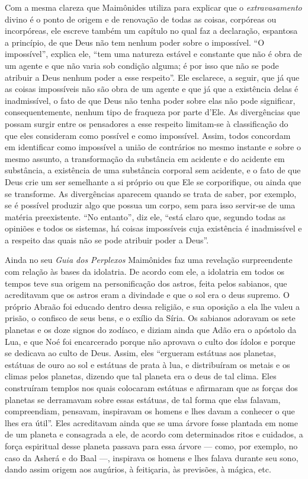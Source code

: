 Com a mesma clareza que Maimônides utiliza para explicar que o
\emph{extravasamento} divino é o ponto de origem e de renovação de todas
as coisas, corpóreas ou incorpóreas, ele escreve também um capítulo no
qual faz a declaração, espantosa a princípio, de que Deus não tem nenhum poder sobre
o impossível. ``O impossível'', explica ele, ``tem uma natureza estável
e constante que não é obra de um agente e que não varia sob condição
alguma; é por isso que não se pode atribuir a Deus nenhum poder a esse
respeito''. Ele esclarece, a seguir, que já que as coisas impossíveis
não são obra de um agente e que já que a existência delas é
inadmissível, o fato de que Deus não tenha poder sobre elas não pode
significar, consequentemente, nenhum tipo de fraqueza por parte d'Ele.
As divergências que possam surgir entre os pensadores a esse respeito
limitam-se à classificação do que eles consideram como possível e como
impossível. Assim, todos concordam em identificar como impossível a
união de contrários no mesmo instante e sobre o mesmo assunto, a
transformação da substância em acidente e do acidente em substância, a
existência de uma substância corporal sem acidente, e o fato de que Deus
crie um ser semelhante a si próprio ou que Ele se corporifique, ou
ainda que se transforme. As divergências aparecem quando se trata de
saber, por exemplo, se é possível produzir algo que possua um corpo,
sem para isso servir-se de uma matéria preexistente. ``No entanto'',
diz ele, ``está claro que, segundo todas as opiniões e todos os
sistemas, há coisas impossíveis cuja existência é inadmissível e a
respeito das quais não se pode atribuir poder a Deus''.

Ainda no seu \emph{Guia dos Perplexos} Maimônides faz uma revelação
surpreendente com relação às bases da idolatria. De acordo com ele, a
idolatria em todos os tempos teve sua origem na personificação dos
astros, feita pelos sabianos, que acreditavam que os astros eram a
divindade e que o sol era o deus supremo. O próprio Abraão foi educado
dentro dessa religião, e sua oposição a ela lhe valeu a prisão, o
confisco de seus bens, e o exílio da Síria. Os sabianos adoravam os sete
planetas e os doze signos do zodíaco, e diziam ainda que Adão era o
apóstolo da Lua, e que Noé foi encarcerado porque não aprovava o culto
dos ídolos e porque se dedicava ao culto de Deus. Assim, eles
``ergueram estátuas aos planetas, estátuas de ouro ao sol e estátuas de
prata à lua, e distribuíram os metais e os climas pelos planetas,
dizendo que tal planeta era o deus de tal clima. Eles construíram
templos nos quais colocaram estátuas e afirmaram que as forças dos
planetas se derramavam sobre essas estátuas, de tal forma que elas
falavam, compreendiam, pensavam, inspiravam os homens e lhes davam a
conhecer o que lhes era útil''. Eles acreditavam ainda que se uma árvore
fosse plantada em nome de um planeta e consagrada a ele, de acordo com
determinados ritos e cuidados, a força espiritual desse planeta passava
para essa árvore --- como, por exemplo, no caso da Asherá e do Baal ---,
inspirava os homens e lhes falava durante seu sono, dando assim origem
aos augúrios, à feitiçaria, às previsões, à mágica, etc.

